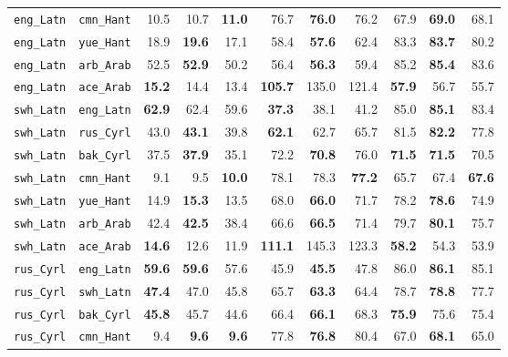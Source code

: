\begin{longtable}{@{}ll rrr rrr rrr@{}}
\texttt{eng\_Latn} & \texttt{cmn\_Hant} & 10.5 & 10.7 & \textbf{11.0} & 76.7 & \textbf{76.0} & 76.2 & 67.9 & \textbf{69.0} & 68.1 \\
\texttt{eng\_Latn} & \texttt{yue\_Hant} & 18.9 & \textbf{19.6} & 17.1 & 58.4 & \textbf{57.6} & 62.4 & 83.3 & \textbf{83.7} & 80.2 \\
\texttt{eng\_Latn} & \texttt{arb\_Arab} & 52.5 & \textbf{52.9} & 50.2 & 56.4 & \textbf{56.3} & 59.4 & 85.2 & \textbf{85.4} & 83.6 \\
\texttt{eng\_Latn} & \texttt{ace\_Arab} & \textbf{15.2} & 14.4 & 13.4 & \textbf{105.7} & 135.0 & 121.4 & \textbf{57.9} & 56.7 & 55.7 \\
\addlinespace
\texttt{swh\_Latn} & \texttt{eng\_Latn} & \textbf{62.9} & 62.4 & 59.6 & \textbf{37.3} & 38.1 & 41.2 & 85.0 & \textbf{85.1} & 83.4 \\
\texttt{swh\_Latn} & \texttt{rus\_Cyrl} & 43.0 & \textbf{43.1} & 39.8 & \textbf{62.1} & 62.7 & 65.7 & 81.5 & \textbf{82.2} & 77.8 \\
\texttt{swh\_Latn} & \texttt{bak\_Cyrl} & 37.5 & \textbf{37.9} & 35.1 & 72.2 & \textbf{70.8} & 76.0 & \textbf{71.5} & \textbf{71.5} & 70.5 \\
\texttt{swh\_Latn} & \texttt{cmn\_Hant} & 9.1 & 9.5 & \textbf{10.0} & 78.1 & 78.3 & \textbf{77.2} & 65.7 & 67.4 & \textbf{67.6} \\
\texttt{swh\_Latn} & \texttt{yue\_Hant} & 14.9 & \textbf{15.3} & 13.5 & 68.0 & \textbf{66.0} & 71.7 & 78.2 & \textbf{78.6} & 74.9 \\
\texttt{swh\_Latn} & \texttt{arb\_Arab} & 42.4 & \textbf{42.5} & 38.4 & 66.6 & \textbf{66.5} & 71.4 & 79.7 & \textbf{80.1} & 75.7 \\
\texttt{swh\_Latn} & \texttt{ace\_Arab} & \textbf{14.6} & 12.6 & 11.9 & \textbf{111.1} & 145.3 & 123.3 & \textbf{58.2} & 54.3 & 53.9 \\
\addlinespace
\texttt{rus\_Cyrl} & \texttt{eng\_Latn} & \textbf{59.6} & \textbf{59.6} & 57.6 & 45.9 & \textbf{45.5} & 47.8 & 86.0 & \textbf{86.1} & 85.1 \\
\texttt{rus\_Cyrl} & \texttt{swh\_Latn} & \textbf{47.4} & 47.0 & 45.8 & 65.7 & \textbf{63.3} & 64.4 & 78.7 & \textbf{78.8} & 77.7 \\
\texttt{rus\_Cyrl} & \texttt{bak\_Cyrl} & \textbf{45.8} & 45.7 & 44.6 & 66.4 & \textbf{66.1} & 68.3 & \textbf{75.9} & 75.6 & 75.4 \\
\texttt{rus\_Cyrl} & \texttt{cmn\_Hant} & 9.4 & \textbf{9.6} & \textbf{9.6} & 77.8 & \textbf{76.8} & 80.4 & 67.0 & \textbf{68.1} & 65.0 \\

\end{longtable}
